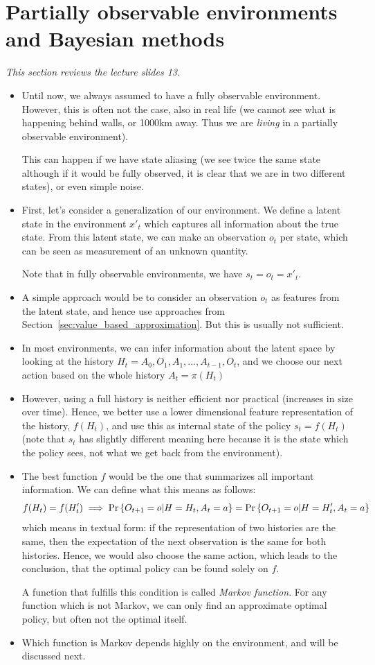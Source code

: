 \section{Partially observable environments and Bayesian methods}
\label{sec:partially_observable}
\textit{This section reviews the lecture slides 13.}
\begin{itemize}
	\item Until now, we always assumed to have a fully observable environment. However, this is often not the case, also in real life (we cannot see what is happening behind walls, or 1000km away. Thus we are \textit{living} in a partially observable environment).
	
	This can happen if we have state aliasing (we see twice the same state although if it would be fully observed, it is clear that we are in two different states), or even simple noise.
	\item First, let's consider a generalization of our environment. We define a latent state in the environment $x'_t$ which captures all information about the true state. From this latent state, we can make an observation $o_t$ per state, which can be seen as measurement of an unknown quantity.
	
	Note that in fully observable environments, we have $s_t=o_t=x'_t$.
	\item A simple approach would be to consider an observation $o_t$ as features from the latent state, and hence use approaches from Section~\ref{sec:value_based_approximation}. But this is usually not sufficient.
	\item In most environments, we can infer information about the latent space by looking at the history $H_t=A_0,O_1,A_1,...,A_{t-1},O_t$, and we choose our next action based on the whole history $A_t=\pi(H_t)$
	\item However, using a full history is neither efficient nor practical (increases in size over time). Hence, we better use a lower dimensional feature representation of the history, $f(H_t)$, and use this as internal state of the policy $s_t = f(H_t)$ (note that $s_t$ has slightly different meaning here because it is the state which the policy sees, not what we get back from the environment).
	\item The best function $f$ would be the one that summarizes all important information. We can define what this means as follows:
	$$f(H_t)=f(H'_t)\implies \Pr\left\{O_{t+1}=o|H=H_t,A_t=a\right\}=\Pr\left\{O_{t+1}=o|H=H'_t,A_t=a\right\}$$
	which means in textual form: if the representation of two histories are the same, then the expectation of the next observation is the same for both histories. Hence, we would also choose the same action, which leads to the conclusion, that the optimal policy can be found solely on $f$.
	
	A function that fulfills this condition is called \textit{Markov function}. For any function which is not Markov, we can only find an approximate optimal policy, but often not the optimal itself.
	\item Which function is Markov depends highly on the environment, and will be discussed next.
\end{itemize}
